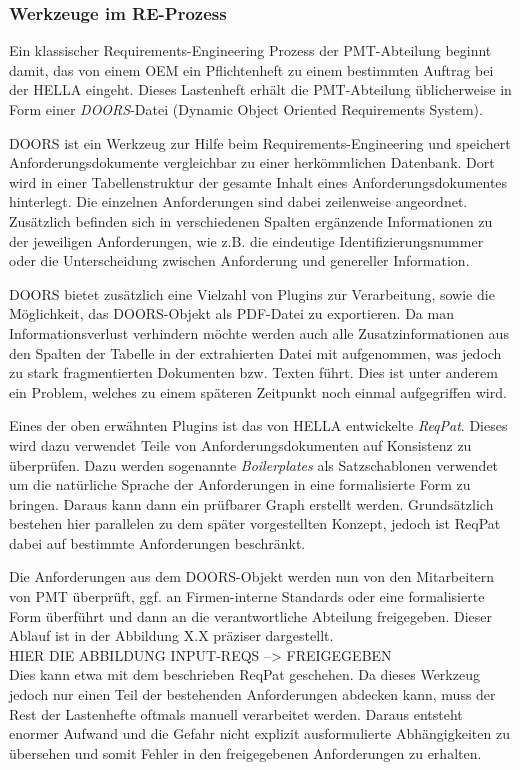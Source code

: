 \documentclass[12pt]{report}
\begin{document}
\subsubsection{Werkzeuge im RE-Prozess}
Ein klassischer Requirements-Engineering Prozess der PMT-Abteilung beginnt damit, das von einem OEM ein Pflichtenheft zu einem bestimmten Auftrag bei der HELLA eingeht. Dieses Lastenheft erhält die PMT-Abteilung üblicherweise in Form einer \textit{DOORS}-Datei (Dynamic Object Oriented Requirements System). 

DOORS ist ein Werkzeug zur Hilfe beim Requirements-Engineering und speichert Anforderungsdokumente vergleichbar zu einer herkömmlichen Datenbank. Dort wird in einer Tabellenstruktur der gesamte Inhalt eines Anforderungsdokumentes hinterlegt. Die einzelnen Anforderungen sind dabei zeilenweise angeordnet. Zusätzlich befinden sich in verschiedenen Spalten ergänzende Informationen zu der jeweiligen Anforderungen, wie z.B. die eindeutige Identifizierungsnummer oder die Unterscheidung zwischen Anforderung und genereller Information.

DOORS bietet zusätzlich eine Vielzahl von Plugins zur Verarbeitung, sowie die Möglichkeit, das DOORS-Objekt als PDF-Datei zu exportieren. Da man Informationsverlust verhindern möchte werden auch alle Zusatzinformationen aus den Spalten der Tabelle in der extrahierten Datei mit aufgenommen, was jedoch zu stark fragmentierten Dokumenten bzw. Texten führt. Dies ist unter anderem ein Problem, welches zu einem späteren Zeitpunkt noch einmal aufgegriffen wird. 

Eines der oben erwähnten Plugins ist das von HELLA entwickelte \textit{ReqPat}. Dieses wird dazu verwendet Teile von Anforderungsdokumenten auf Konsistenz zu überprüfen. Dazu werden sogenannte \textit{Boilerplates} als Satzschablonen verwendet um die natürliche Sprache der Anforderungen in eine formalisierte Form zu bringen. Daraus kann dann ein prüfbarer Graph erstellt werden. Grundsätzlich bestehen hier parallelen zu dem später vorgestellten Konzept, jedoch ist ReqPat dabei auf bestimmte Anforderungen beschränkt. 

Die Anforderungen aus dem DOORS-Objekt werden nun von den Mitarbeitern von PMT überprüft, ggf. an Firmen-interne Standards oder eine formalisierte Form überführt und dann an die verantwortliche Abteilung freigegeben. Dieser Ablauf ist in der Abbildung X.X präziser dargestellt.
\\
\newline
HIER DIE ABBILDUNG INPUT-REQS --> FREIGEGEBEN
\\
\newline
Dies kann etwa mit dem beschrieben ReqPat geschehen. Da dieses Werkzeug jedoch nur einen Teil der bestehenden Anforderungen abdecken kann, muss der Rest der Lastenhefte oftmals manuell verarbeitet werden. Daraus entsteht enormer Aufwand und die Gefahr nicht explizit ausformulierte Abhängigkeiten zu übersehen und somit Fehler in den freigegebenen Anforderungen zu erhalten. 
\end{document}
